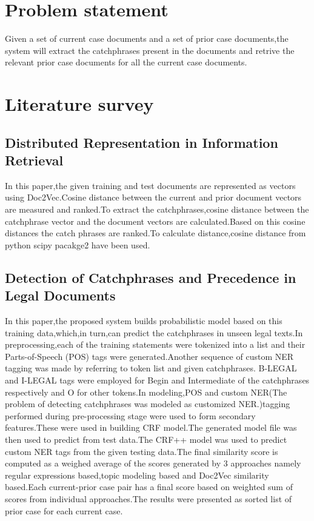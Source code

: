 \documentclass[12pt,a4paper]{article}
\begin{document}
\section{Problem statement}
Given a set of current case documents and a set of prior case documents,the system will extract the catchphrases present in the documents and retrive the relevant prior case documents for all the current case documents.

\section{Literature survey}
\subsection{Distributed Representation in Information Retrieval\cite{reshma2017distributed}}
In this paper,the given training and test documents are represented as vectors using Doc2Vec.Cosine distance between the current and prior document vectors are measured and ranked.To extract the catchphrases,cosine distance between the catchphrase vector and the document vectors are calculated.Based on this cosine distances the catch phrases are ranked.To calculate distance,cosine distance from python scipy pacakge2 have been used.
\subsection{Detection of Catchphrases and Precedence in Legal Documents\cite{kulkarni2017detection}}
In this paper,the proposed system builds probabilistic model based on this training data,which,in turn,can predict the catchphrases in unseen legal texts.In preprocessing,each of the training statements were tokenized into a list and their Parts-of-Speech (POS) tags were generated.Another sequence of custom NER tagging was made by referring to token list and given catchphrases. B-LEGAL and I-LEGAL tags were employed for Begin and Intermediate of the catchphrases respectively and O for other tokens.In modeling,POS and custom NER(The problem of detecting catchphrases was modeled as customized NER.)tagging performed during pre-processing stage were used to form secondary features.These were used in building CRF model.The generated model file was then used to predict from test data.The CRF++ model was used to predict custom NER tags from the given testing data.The final similarity score is computed as a weighed average of the scores generated by 3 approaches namely regular expressions based,topic modeling based and Doc2Vec similarity based.Each current-prior case pair has a final score based on weighted sum of scores from individual approaches.The results were presented as sorted list of prior case for each current case.
\end{document}
